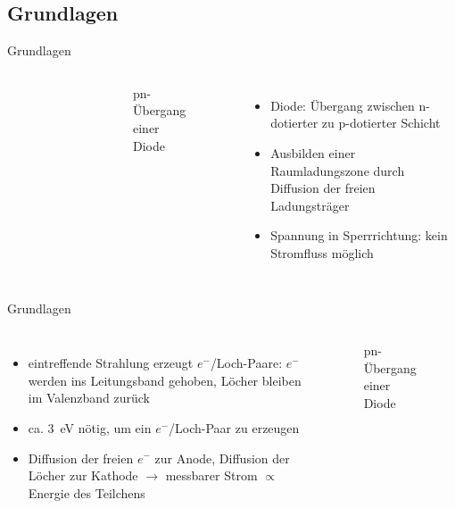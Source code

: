 \subsection[]{Grundlagen}

\begin{frame}{Grundlagen}
    \begin{columns}[T]
	    	\vspace{-0.5cm}
			\begin{figure}[htbp]
			  \centering
			  
			\end{figure}
			\vspace{-1.2cm}
			\begin{figure}[htbp]
			  \centering
			   
			   \vspace{-0.5cm}
			  \caption{pn-Übergang einer Diode}
			\end{figure}
			
	    	\begin{itemize}
	    	  \item Diode: Übergang zwischen n-dotierter zu p-dotierter Schicht
			  \item Ausbilden einer Raumladungszone durch Diffusion der freien Ladungsträger
			  \item Spannung in Sperrrichtung: kein Stromfluss möglich
			\end{itemize}
    \end{columns}
\end{frame}

\begin{frame}{Grundlagen}
    \begin{columns}[T]	
	    	\begin{itemize}
	    	  \item eintreffende Strahlung erzeugt $e^-$/Loch-Paare: $e^-$ werden ins Leitungsband
	    	  gehoben, Löcher bleiben im Valenzband zurück
	    	  \item ca. 3~eV nötig, um ein $e^-$/Loch-Paar zu erzeugen
	    	  \item Diffusion der freien $e^-$ zur Anode, Diffusion der Löcher zur Kathode $\rightarrow$
	    	  messbarer Strom $\propto$ Energie des Teilchens
			\end{itemize}
			
			\begin{figure}[htbp]
			  \centering
			   
			  \caption{pn-Übergang einer Diode}
			\end{figure}
    \end{columns}
\end{frame}